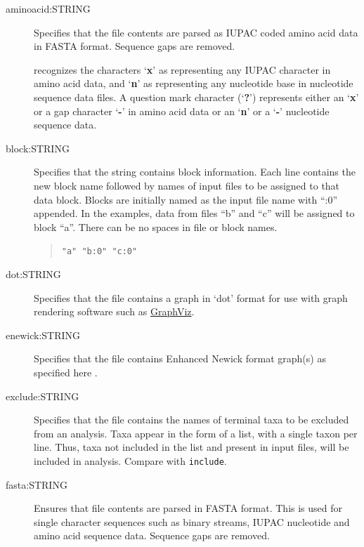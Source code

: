 	\begin{description}
		\item [aminoacid:STRING] Specifies that the file contents are parsed as IUPAC coded amino 
		acid data in FASTA \citep{PearsonandLipman1988} format.  Sequence gaps are removed.

		\begin{tcolorbox}[enhanced,fit to height=3cm,
  		colback=JungleGreen!40!black!2!white,colframe=JungleGreen!70!black,title=Note,
  		drop fuzzy shadow]
  		\phyg recognizes the characters `\textbf{x}' as representing any IUPAC character in amino
		acid data, and `\textbf{n}' as representing any nucleotide base in nucleotide sequence
		data files. A question mark character (`\textbf{?}') represents either an `\textbf{x}'  or a 
		gap character `\textbf{-}' in amino acid data or an `\textbf{n}' or a `\textbf{-}' nucleotide
		sequence data.
		\end{tcolorbox}

		\item [block:STRING] Specifies that the string contains block %
		information. Each line contains 
		the new block name followed by names of input files to be assigned to that data block. 
		Blocks are initially named as the input file name with ``:0'' appended. In the examples, 
		data from files ``b'' and ``c'' will be assigned to block ``a''. There can be no spaces in 
		file or block names.
			
			\begin{quote}
			\texttt{"a" "b:0" "c:0"}
			\end{quote}
	
		\item [dot:STRING] Specifies that the file contains a graph in `dot' format for use with graph 
		rendering software such as \href{https://en.wikipedia.org/wiki/Graphviz}{GraphViz}.
			
		\item [enewick:STRING] Specifies that the file contains Enhanced Newick format graph(s) as
		specified here \citep{Cardonaetal2008}. 
			
		\item [exclude:STRING] Specifies that the file contains the names of terminal taxa to be 
		excluded from an analysis. Taxa appear in the form of a list, with a single taxon per 
		line. Thus, taxa not included in the list and present in input files, will be included in 
		analysis. Compare with \texttt{include}.
			
		\item [fasta:STRING] Ensures that file contents are parsed in FASTA \citep{PearsonandLipman1988}
		format. This is used for single character sequences such as binary streams, IUPAC 
		nucleotide and amino acid sequence data.   Sequence gaps are removed.
			

\end{description}
